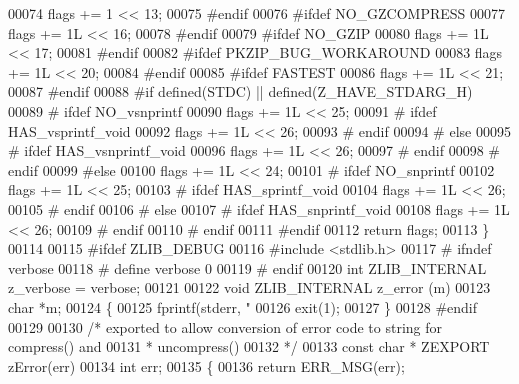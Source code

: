 \begin{DoxyCode}
00074     flags += 1 << 13;
00075 \textcolor{preprocessor}{#endif}
00076 \textcolor{preprocessor}{#ifdef NO\_GZCOMPRESS}
00077     flags += 1L << 16;
00078 \textcolor{preprocessor}{#endif}
00079 \textcolor{preprocessor}{#ifdef NO\_GZIP}
00080     flags += 1L << 17;
00081 \textcolor{preprocessor}{#endif}
00082 \textcolor{preprocessor}{#ifdef PKZIP\_BUG\_WORKAROUND}
00083     flags += 1L << 20;
00084 \textcolor{preprocessor}{#endif}
00085 \textcolor{preprocessor}{#ifdef FASTEST}
00086     flags += 1L << 21;
00087 \textcolor{preprocessor}{#endif}
00088 \textcolor{preprocessor}{#if defined(STDC) || defined(Z\_HAVE\_STDARG\_H)}
00089 \textcolor{preprocessor}{#  ifdef NO\_vsnprintf}
00090     flags += 1L << 25;
00091 \textcolor{preprocessor}{#    ifdef HAS\_vsprintf\_void}
00092     flags += 1L << 26;
00093 \textcolor{preprocessor}{#    endif}
00094 \textcolor{preprocessor}{#  else}
00095 \textcolor{preprocessor}{#    ifdef HAS\_vsnprintf\_void}
00096     flags += 1L << 26;
00097 \textcolor{preprocessor}{#    endif}
00098 \textcolor{preprocessor}{#  endif}
00099 \textcolor{preprocessor}{#else}
00100     flags += 1L << 24;
00101 \textcolor{preprocessor}{#  ifdef NO\_snprintf}
00102     flags += 1L << 25;
00103 \textcolor{preprocessor}{#    ifdef HAS\_sprintf\_void}
00104     flags += 1L << 26;
00105 \textcolor{preprocessor}{#    endif}
00106 \textcolor{preprocessor}{#  else}
00107 \textcolor{preprocessor}{#    ifdef HAS\_snprintf\_void}
00108     flags += 1L << 26;
00109 \textcolor{preprocessor}{#    endif}
00110 \textcolor{preprocessor}{#  endif}
00111 \textcolor{preprocessor}{#endif}
00112     \textcolor{keywordflow}{return} flags;
00113 \}
00114 
00115 \textcolor{preprocessor}{#ifdef ZLIB\_DEBUG}
00116 \textcolor{preprocessor}{#include <stdlib.h>}
00117 \textcolor{preprocessor}{#  ifndef verbose}
00118 \textcolor{preprocessor}{#    define verbose 0}
00119 \textcolor{preprocessor}{#  endif}
00120 \textcolor{keywordtype}{int} ZLIB\_INTERNAL z\_verbose = verbose;
00121 
00122 \textcolor{keywordtype}{void} ZLIB\_INTERNAL z\_error (m)
00123     \textcolor{keywordtype}{char} *m;
00124 \{
00125     fprintf(stderr, \textcolor{stringliteral}{"%
00126     exit(1);
00127 \}
00128 \textcolor{preprocessor}{#endif}
00129 
00130 \textcolor{comment}{/* exported to allow conversion of error code to string for compress() and}
00131 \textcolor{comment}{ * uncompress()}
00132 \textcolor{comment}{ */}
00133 \textcolor{keyword}{const} \textcolor{keywordtype}{char} * ZEXPORT zError(err)
00134     \textcolor{keywordtype}{int} err;
00135 \{
00136     \textcolor{keywordflow}{return} ERR\_MSG(err);
}
\end{DoxyCode}
